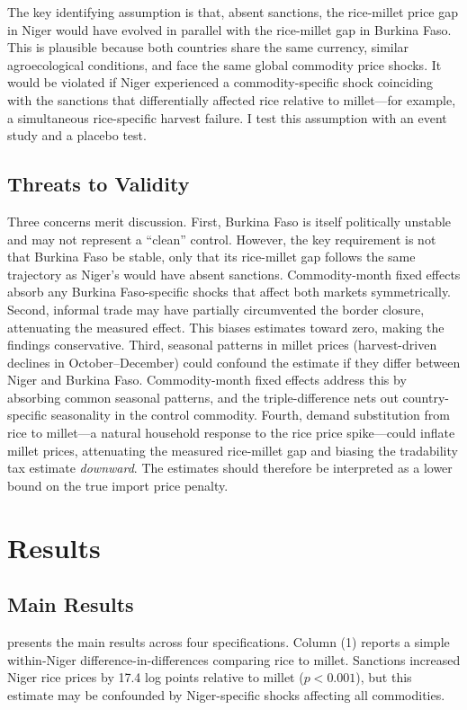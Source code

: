 \documentclass[12pt]{article}
\begin{document}
The key identifying assumption is that, absent sanctions, the rice-millet price gap in Niger would have evolved in parallel with the rice-millet gap in Burkina Faso. This is plausible because both countries share the same currency, similar agroecological conditions, and face the same global commodity price shocks. It would be violated if Niger experienced a commodity-specific shock coinciding with the sanctions that differentially affected rice relative to millet---for example, a simultaneous rice-specific harvest failure. I test this assumption with an event study and a placebo test.

\subsection{Threats to Validity}

Three concerns merit discussion. First, Burkina Faso is itself politically unstable and may not represent a ``clean'' control. However, the key requirement is not that Burkina Faso be stable, only that its rice-millet gap follows the same trajectory as Niger's would have absent sanctions. Commodity-month fixed effects absorb any Burkina Faso-specific shocks that affect both markets symmetrically. Second, informal trade may have partially circumvented the border closure, attenuating the measured effect. This biases estimates toward zero, making the findings conservative. Third, seasonal patterns in millet prices (harvest-driven declines in October--December) could confound the estimate if they differ between Niger and Burkina Faso. Commodity-month fixed effects address this by absorbing common seasonal patterns, and the triple-difference nets out country-specific seasonality in the control commodity. Fourth, demand substitution from rice to millet---a natural household response to the rice price spike---could inflate millet prices, attenuating the measured rice-millet gap and biasing the tradability tax estimate \textit{downward}. The estimates should therefore be interpreted as a lower bound on the true import price penalty.

\section{Results}

\subsection{Main Results}

 presents the main results across four specifications. Column (1) reports a simple within-Niger difference-in-differences comparing rice to millet. Sanctions increased Niger rice prices by 17.4 log points relative to millet ($p < 0.001$), but this estimate may be confounded by Niger-specific shocks affecting all commodities.
\end{document}
